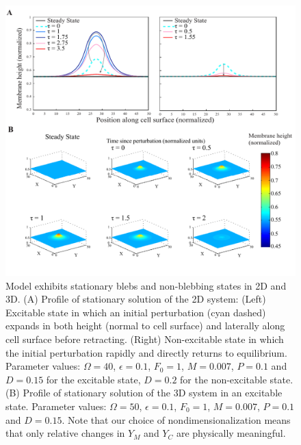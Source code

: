 \begin{figure}
\captionsetup{width=17cm}
	\includegraphics[width=17cm,center]{Project1/figs/figure2}
      \caption{Model exhibits stationary blebs and non-blebbing states in 2D and 3D. (A) Profile of stationary solution of the 2D system: (Left) Excitable state in which an initial perturbation (cyan dashed) expands in both height (normal to cell surface) and laterally along cell surface before retracting. (Right) Non-excitable state in which the initial perturbation rapidly and directly returns to equilibrium. Parameter values: $\Omega = 40$, $\epsilon = 0.1$, $F_0 = 1$, $M = 0.007$, $P = 0.1$ and $D = 0.15$ for the excitable state, $D = 0.2$ for the non-excitable state. (B) Profile of stationary solution  of the 3D system in an excitable state. Parameter values: $\Omega = 50$, $\epsilon = 0.1$, $F_0 = 1$, $M = 0.007$, $P = 0.1$ and $D = 0.15$. Note that our choice of nondimensionalization means that only relative changes in $Y_M$ and $Y_C$ are physically meaningful.}
      \label{fig::stationary}
\end{figure}





